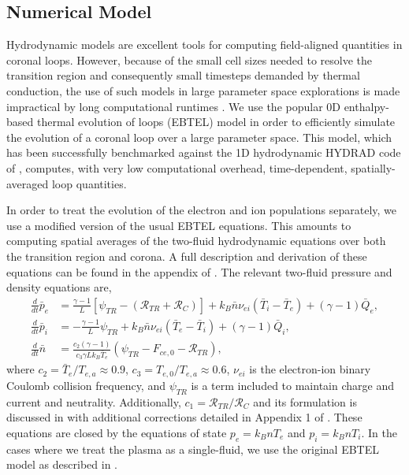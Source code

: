 \documentclass[preprint,linenumbers]{aastex}
\begin{document}
	\subsection{Numerical Model}
	\label{subsec:numerics}
	\par Hydrodynamic models are excellent tools for computing field-aligned quantities in coronal loops. However, because of the small cell sizes needed to resolve the transition region and consequently small timesteps demanded by thermal conduction, the use of such models in large parameter space explorations is made impractical by long computational runtimes \citep{bradshaw_influence_2013}. We use the popular 0D enthalpy-based thermal evolution of loops (EBTEL) model \citep{klimchuk_highly_2008,cargill_enthalpy-based_2012,cargill_enthalpy-based_2012-1,cargill_modelling_2015} in order to efficiently simulate the evolution of a coronal loop over a large parameter space. This model, which has been successfully benchmarked against the 1D hydrodynamic HYDRAD code of \citet{bradshaw_influence_2013}, computes, with very low computational overhead, time-dependent, spatially-averaged loop quantities.
	\par In order to treat the evolution of the electron and ion populations separately, we use a modified version of the usual EBTEL equations. This amounts to computing spatial averages of the two-fluid hydrodynamic equations over both the transition region and corona. A full description and derivation of these equations can be found in the appendix of . The relevant two-fluid pressure and density equations are,
	\begin{align}
		\frac{d}{dt}\bar{p}_e &= \frac{\gamma - 1}{L}\left\lbrack\psi_{TR} - (\mathcal{R}_{TR} + \mathcal{R}_C)\right\rbrack + k_B\bar{n}\nu_{ei}(\bar{T}_i - \bar{T}_e) + (\gamma - 1)\bar{Q}_e,\label{eq:ebtel2fl_pe}\\
		\frac{d}{dt}\bar{p}_i &= -\frac{\gamma - 1}{L}\psi_{TR} + k_B\bar{n}\nu_{ei}(\bar{T}_e - \bar{T}_i) + (\gamma - 1)\bar{Q}_i,\label{eq:ebtel2fl_pi}\\
		\frac{d}{dt}\bar{n} &= \frac{c_2(\gamma - 1)}{c_3\gamma Lk_B\bar{T}_e}\left(\psi_{TR} - F_{ce,0} - \mathcal{R}_{TR}\right),\label{eq:ebtel2fl_n}
	\end{align}
	where $c_2=\bar{T}_e/T_{e,a}\approx0.9$, $c_3=T_{e,0}/T_{e,a}\approx0.6$, $\nu_{ei}$ is the electron-ion binary Coulomb collision frequency, and $\psi_{TR}$ is a term included to maintain charge and current and neutrality. Additionally, $c_1=\mathcal{R}_{TR}/\mathcal{R}_C$ and its formulation is discussed in \citet{cargill_enthalpy-based_2012} with additional corrections detailed in Appendix 1 of . These equations are closed by the equations of state $p_e=k_BnT_e$ and $p_i=k_BnT_i$. In the cases where we treat the plasma as a single-fluid, we use the original EBTEL model as described in \citet{klimchuk_highly_2008,cargill_enthalpy-based_2012}.
\end{document}
